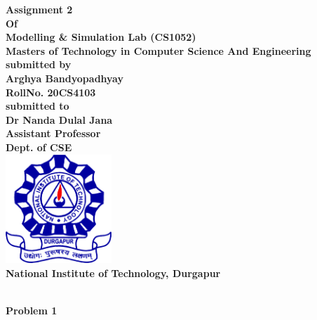 \documentclass[12pt, letterpaper, twoside]{book}
\date{23nd May 2021}
\begin{document}
\begin{titlepage}
	\begin{center}
       \vspace*{5cm}
       \bfseries\Large
    	Assignment 2\\
    	Of\\
    	Modelling \& Simulation Lab (CS1052)\\
        \vskip1cm
        Masters of Technology in Computer Science And Engineering\\
        \vskip1cm
        submitted by\\
    	Arghya Bandyopadhyay\\
    	RollNo. 20CS4103\\
    	\vskip1cm
    	submitted to\\
    	Dr Nanda Dulal Jana\\
    	Assistant Professor\\
    	Dept. of CSE\\
    	\vskip1cm
    	\includegraphics[width=4cm]{NITDGP}\\
    	National Institute of Technology, Durgapur\\
    \end{center}
\end{titlepage}
\begin{center}
\textbf{\\Problem 1}
\end{center}
\end{document}
